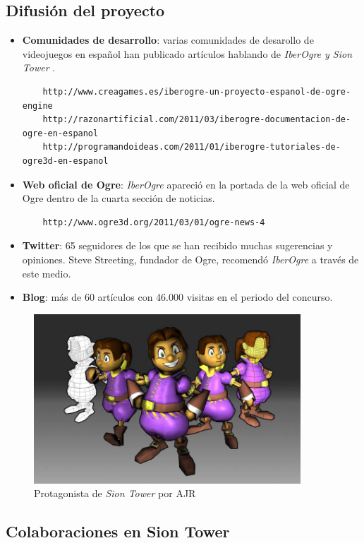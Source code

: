 \documentclass[16pt,spanish]{article}
\def \proyecto{\emph {IberOgre y Sion Tower} }
\def \juego{\emph {Sion Tower} }
\def \wiki{\emph{IberOgre} }
\begin{document}
\subsection{Difusión del proyecto}

\begin{itemize}
    \item \textbf{Comunidades de desarrollo}: varias comunidades de desarollo
    de videojuegos en español han publicado artículos hablando de \proyecto.
    \begin{verbatim}
    http://www.creagames.es/iberogre-un-proyecto-espanol-de-ogre-engine
    http://razonartificial.com/2011/03/iberogre-documentacion-de-ogre-en-espanol
    http://programandoideas.com/2011/01/iberogre-tutoriales-de-ogre3d-en-espanol
    \end{verbatim}
    \item \textbf{Web oficial de Ogre}: \wiki apareció en la portada de
    la web oficial de Ogre dentro de la cuarta sección de noticias.
    \begin{verbatim}
    http://www.ogre3d.org/2011/03/01/ogre-news-4
    \end{verbatim}
    \item \textbf{Twitter}: 65 seguidores de los que se han recibido muchas
    sugerencias y opiniones. Steve Streeting, fundador de Ogre, recomendó
    \wiki a través de este medio.
    \item \textbf{Blog}: más de 60 artículos con 46.000 visitas en el
    periodo del concurso.
\end{itemize}

\begin{figure}[H]
    \centering
        \includegraphics[width=10cm]{img/collage-protagonista.jpg} 
    \caption{Protagonista de \juego por AJR}
    \label{img:protagonista}
\end{figure}


\subsection{Colaboraciones en Sion Tower}
\end{document}
